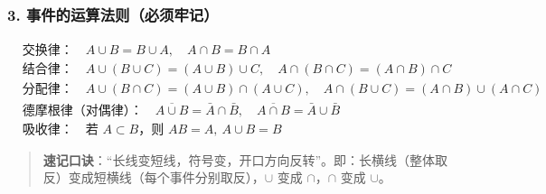 \documentclass[12pt,a4paper]{ctexart}
\newenvironment{myquote}
  {\par\vspace{0.5em}\begin{quote}\sffamily\color{gray}}
  {\end{quote}\vspace{0.5em}}
\begin{document}
\subsubsection{3. 事件的运算法则（必须牢记）}
\begin{align*}
     & \text{交换律：}\quad A\cup B = B\cup A,\quad A\cap B = B\cap A                                                     \\
     & \text{结合律：}\quad A\cup (B\cup C) = (A\cup B)\cup C,\quad A\cap (B\cap C) = (A\cap B)\cap C                     \\
     & \text{分配律：}\quad A\cup (B\cap C) = (A\cup B)\cap (A\cup C),\quad A\cap (B\cup C) = (A\cap B)\cup (A\cap C)     \\
     & \text{德摩根律（对偶律）：}\quad \overline{A\cup B} = \bar{A}\cap \bar{B},\quad \overline{A\cap B} = \bar{A}\cup \bar{B} \\
     & \text{吸收律：}\quad \text{若 }A\subset B\text{，则 }AB = A,\ A\cup B = B
\end{align*}

\begin{myquote}
    \textbf{速记口诀}：“长线变短线，符号变，开口方向反转”。即：长横线（整体取反）变成短横线（每个事件分别取反），$\cup$ 变成 $\cap$，$\cap$ 变成 $\cup$。
\end{myquote}
\end{document}
